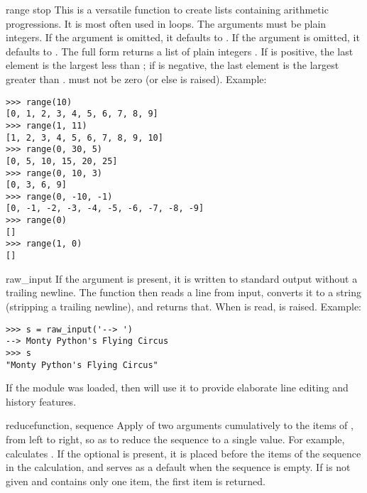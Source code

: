 \begin{funcdesc}{range}{ stop}
  This is a versatile function to create lists containing arithmetic
  progressions.  It is most often used in  loops.  The
  arguments must be plain integers.  If the  argument is
  omitted, it defaults to .  If the  argument is
  omitted, it defaults to .  The full form returns a list of
  plain integers .  If  is positive,
  the last element is the largest  less than ; if  is negative, the last
  element is the largest 
  greater than .   must not be zero (or else
   is raised).  Example:

\begin{verbatim}
>>> range(10)
[0, 1, 2, 3, 4, 5, 6, 7, 8, 9]
>>> range(1, 11)
[1, 2, 3, 4, 5, 6, 7, 8, 9, 10]
>>> range(0, 30, 5)
[0, 5, 10, 15, 20, 25]
>>> range(0, 10, 3)
[0, 3, 6, 9]
>>> range(0, -10, -1)
[0, -1, -2, -3, -4, -5, -6, -7, -8, -9]
>>> range(0)
[]
>>> range(1, 0)
[]
\end{verbatim}
\end{funcdesc}

\begin{funcdesc}{raw_input}{}
  If the  argument is present, it is written to standard output
  without a trailing newline.  The function then reads a line from input,
  converts it to a string (stripping a trailing newline), and returns that.
  When \EOF{} is read,  is raised. Example:

\begin{verbatim}
>>> s = raw_input('--> ')
--> Monty Python's Flying Circus
>>> s
"Monty Python's Flying Circus"
\end{verbatim}

  If the  module was loaded, then
   will use it to provide elaborate
  line editing and history features.
\end{funcdesc}

\begin{funcdesc}{reduce}{function, sequence}
  Apply  of two arguments cumulatively to the items of
  , from left to right, so as to reduce the sequence to
  a single value.  For example,  calculates .  If the optional
   is present, it is placed before the items of the
  sequence in the calculation, and serves as a default when the
  sequence is empty.  If  is not given and
   contains only one item, the first item is returned.
\end{funcdesc}

